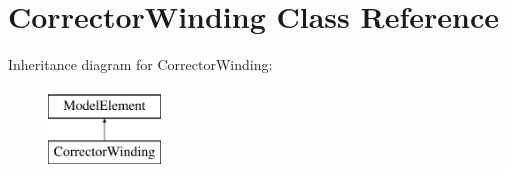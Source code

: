 \hypertarget{classCorrectorWinding}{}\section{Corrector\+Winding Class Reference}
\label{classCorrectorWinding}
Inheritance diagram for Corrector\+Winding\+:\begin{figure}[H]
\begin{center}
\leavevmode
\includegraphics[height=2.000000cm]{classCorrectorWinding}
\end{center}
\end{figure}
